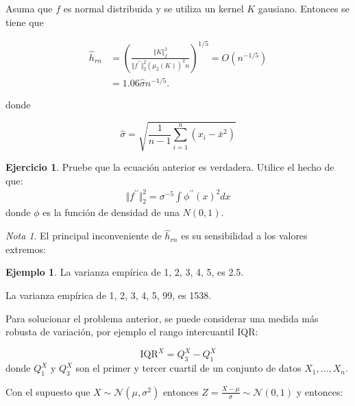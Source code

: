 \documentclass[
  12pt,
]{book}
\theoremstyle{definition}
\theoremstyle{definition}
\newtheorem{example}{Ejemplo}[chapter]
\theoremstyle{definition}
\newtheorem{exercise}{Ejercicio}[chapter]
\theoremstyle{definition}
\theoremstyle{remark}
\newtheorem*{remark}{Nota}
\begin{document}
Asuma que \(f\) es normal distribuida y se utiliza un kernel \(K\) gausiano.
Entonces se tiene que

\begin{align*}
\hat{h}_{rn} & =\left(\frac{\Vert K\Vert_{2}^{2}}{\Vert f^{\prime\prime}\Vert_{2}^{2}\left(\mu_{2}(K)\right)^{2}n}\right)^{1/5}=O\left( n^{-1/5} \right) \\
& =1.06 \hat{\sigma} n^{-1/5}.
\end{align*}

donde

\begin{equation*}
\hat{\sigma} = \sqrt{\frac{1}{n-1} \sum_{i=1}^{n} \left( x_{i}-\bar{x}^{2} \right)}
\end{equation*}

\begin{exercise}
\protect\hypertarget{exr:unnamed-chunk-35}{}\label{exr:unnamed-chunk-35}Pruebe que la ecuación anterior es verdadera. Utilice el hecho de que:
\begin{align*}
\Vert f^{\prime\prime}\Vert_{2}^{2}=\sigma^{-5}\int \phi^{\prime \prime}(x)^2 dx
\end{align*}
donde \(\phi\) es la función de densidad de una \(N(0,1)\).
\end{exercise}

\begin{remark}
El principal inconveniente de \(\hat{h}_{rn}\) es su sensibilidad a los valores extremos:
\end{remark}

\begin{example}
\protect\hypertarget{exm:unnamed-chunk-37}{}\label{exm:unnamed-chunk-37}La varianza empírica de 1, 2, 3, 4, 5, es 2.5.

La varianza empírica de 1, 2, 3, 4, 5, 99, es 1538.
\end{example}

Para solucionar el problema anterior, se puede considerar una medida más robusta de variación, por ejemplo el rango intercuantil IQR:

\begin{equation*}
\mathrm{IQR}^{X} = Q^{X}_{3} - Q^{X}_{1}
\end{equation*}
donde \(Q^{X}_{1}\) y \(Q^{X}_{3}\) son el primer y tercer cuartil de un conjunto de datos \(X_{1},\ldots, X_n\).

Con el supuesto que \(X\sim \mathcal{N}(\mu,\sigma^{2})\) entonces \(\displaystyle Z = \frac{X-\mu}{\sigma} \sim \mathcal{N}(0,1)\) y entonces:
\end{document}
